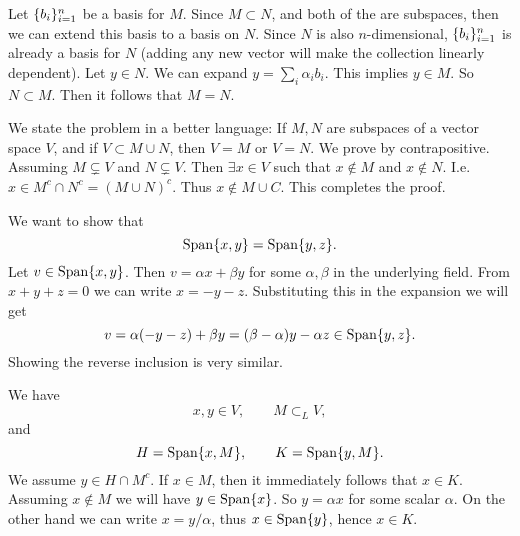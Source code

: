 \begin{problem}
	\begin{solution}
		Let $ \{b_i\}_{i=1}^n $ be a basis for $ M $. Since $ M\subset N $, and both of the are subspaces, then we can extend this basis to a basis on $ N $. Since $ N $ is also $ n $-dimensional, $ \{b_i\}_{i=1}^n $ is already a basis for $ N $ (adding any new vector will make the collection linearly dependent). Let $ y \in N $. We can expand $ y = \sum_i \alpha_i b_i $. This implies $ y \in M $. So $ N \subset M $. Then it follows that $ M = N $.
	\end{solution}
\end{problem}


\begin{problem}
	\begin{solution}
		We state the problem in a better language: If $ M,N $ are subspaces of a vector space $ V $, and if $ V \subset M \cup N $, then $ V = M $ or $ V = N $. We prove by contrapositive. Assuming $ M\varsubsetneq V $ and $ N\varsubsetneq V $. Then $ \exists x \in V $ such that $ x \notin M $ and $ x\notin N $. I.e. $ x \in M^c \cap N^c = (M\cup N)^c $. Thus $ x \notin M\cup C $.
		This completes the proof.
	\end{solution}
\end{problem}


\begin{problem}
	\begin{solution}
		We want to show that 
		\[ \operatorname{Span}\{x,y\} = \operatorname{Span}\{y,z\}. \]
		Let $ v \in \operatorname{Span}\{x,y\} $. Then $ v = \alpha x + \beta y $ for some $ \alpha,\beta $ in the underlying field. From $ x+y+z= 0 $ we can write $ x = -y-z $. Substituting this in the expansion we will get
		\[ v = \alpha (-y-z) + \beta y = (\beta - \alpha)y - \alpha z \in \operatorname{Span}\{y,z\}. \]
		Showing the reverse inclusion is very similar.
	\end{solution}
\end{problem}


\begin{problem}
	\begin{solution}
		We have 
		\[ x,y\in V, \qquad M \subset_L V, \]
		and 
		\[ H = \operatorname{Span}\{x,M\}, \qquad K = \operatorname{Span}\{y,M\}. \]
		We assume $ y \in H\cap M^c $. If $ x\in M $, then it immediately follows that $ x\in K $. Assuming $ x\notin M $ we will have $ y \in \operatorname{Span}\{x\} $. So $ y = \alpha x $ for some scalar $ \alpha $. On the other hand we can write $ x = y/\alpha $, thus $ x\in \operatorname{Span}\{y\} $, hence $ x \in K $.
	\end{solution}
\end{problem}


